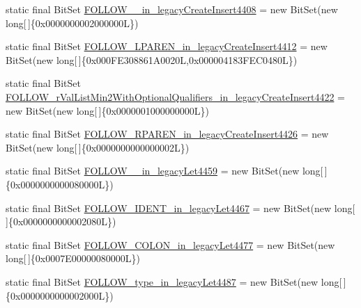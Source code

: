 \begin{DoxyCompactItemize}
\item 
static final Bit\-Set \hyperlink{classorg_1_1tzi_1_1use_1_1parser_1_1testsuite_1_1_test_suite_parser_aeadb23dc799aeed6162b9d9816962da4}{F\-O\-L\-L\-O\-W\-\_\-\_\-in\-\_\-legacy\-Create\-Insert4408} = new Bit\-Set(new long\mbox{[}$\,$\mbox{]}\{0x0000000002000000\-L\})
\item 
static final Bit\-Set \hyperlink{classorg_1_1tzi_1_1use_1_1parser_1_1testsuite_1_1_test_suite_parser_a3ae65039dfa0037c44ce1baada557dc8}{F\-O\-L\-L\-O\-W\-\_\-\-L\-P\-A\-R\-E\-N\-\_\-in\-\_\-legacy\-Create\-Insert4412} = new Bit\-Set(new long\mbox{[}$\,$\mbox{]}\{0x000\-F\-E308861\-A0020\-L,0x000004183\-F\-E\-C0480\-L\})
\item 
static final Bit\-Set \hyperlink{classorg_1_1tzi_1_1use_1_1parser_1_1testsuite_1_1_test_suite_parser_a75c77c810db6bd49ddfb5dc17b395c43}{F\-O\-L\-L\-O\-W\-\_\-r\-Val\-List\-Min2\-With\-Optional\-Qualifiers\-\_\-in\-\_\-legacy\-Create\-Insert4422} = new Bit\-Set(new long\mbox{[}$\,$\mbox{]}\{0x0000001000000000\-L\})
\item 
static final Bit\-Set \hyperlink{classorg_1_1tzi_1_1use_1_1parser_1_1testsuite_1_1_test_suite_parser_ab0ad17587c2caab06114135afd6c5556}{F\-O\-L\-L\-O\-W\-\_\-\-R\-P\-A\-R\-E\-N\-\_\-in\-\_\-legacy\-Create\-Insert4426} = new Bit\-Set(new long\mbox{[}$\,$\mbox{]}\{0x0000000000000002\-L\})
\item 
static final Bit\-Set \hyperlink{classorg_1_1tzi_1_1use_1_1parser_1_1testsuite_1_1_test_suite_parser_a39ed6a1d9ed136e5c6461f6228449e98}{F\-O\-L\-L\-O\-W\-\_\-\_\-in\-\_\-legacy\-Let4459} = new Bit\-Set(new long\mbox{[}$\,$\mbox{]}\{0x0000000000080000\-L\})
\item 
static final Bit\-Set \hyperlink{classorg_1_1tzi_1_1use_1_1parser_1_1testsuite_1_1_test_suite_parser_a47655411859f4a5c68e77baf0f411a5a}{F\-O\-L\-L\-O\-W\-\_\-\-I\-D\-E\-N\-T\-\_\-in\-\_\-legacy\-Let4467} = new Bit\-Set(new long\mbox{[}$\,$\mbox{]}\{0x0000000000002080\-L\})
\item 
static final Bit\-Set \hyperlink{classorg_1_1tzi_1_1use_1_1parser_1_1testsuite_1_1_test_suite_parser_a1036025830419f4074dd0932683548e4}{F\-O\-L\-L\-O\-W\-\_\-\-C\-O\-L\-O\-N\-\_\-in\-\_\-legacy\-Let4477} = new Bit\-Set(new long\mbox{[}$\,$\mbox{]}\{0x0007\-E00000080000\-L\})
\item 
static final Bit\-Set \hyperlink{classorg_1_1tzi_1_1use_1_1parser_1_1testsuite_1_1_test_suite_parser_a6dcfbb7f14d6d81e15477c2f3e6561bf}{F\-O\-L\-L\-O\-W\-\_\-type\-\_\-in\-\_\-legacy\-Let4487} = new Bit\-Set(new long\mbox{[}$\,$\mbox{]}\{0x0000000000002000\-L\})

\end{DoxyCompactItemize}
